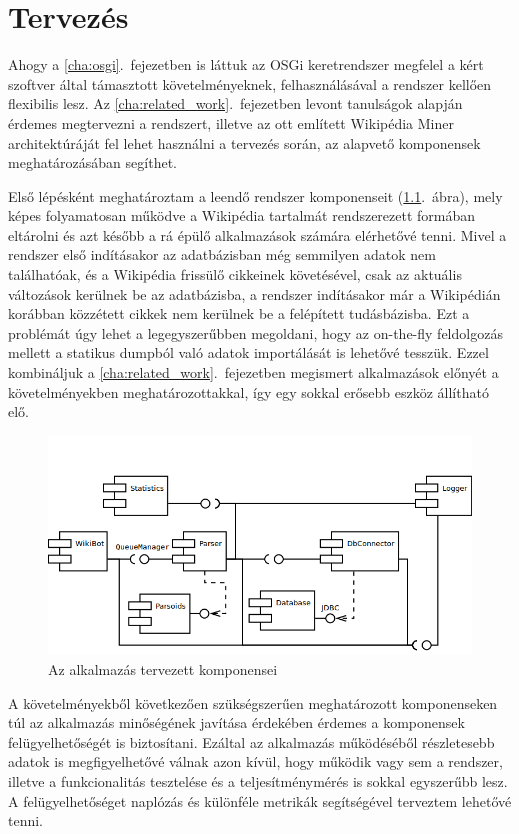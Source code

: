 \chapter{Tervezés}
\label{cha:design}

Ahogy a \ref{cha:osgi}.~fejezetben is láttuk az OSGi keretrendszer megfelel a kért szoftver által támasztott követelményeknek, felhasználásával a rendszer kellően flexibilis lesz. Az \ref{cha:related_work}.~fejezetben levont tanulságok alapján érdemes megtervezni a rendszert, illetve az ott említett Wikipédia Miner architektúráját fel lehet használni a tervezés során, az alapvető komponensek meghatározásában segíthet.

Első lépésként meghatároztam a leendő rendszer komponenseit (\ref{fig:componentdiagram}.~ábra), mely képes folyamatosan működve a Wikipédia tartalmát rendszerezett formában eltárolni és azt később a rá épülő alkalmazások számára elérhetővé tenni. Mivel a rendszer első indításakor az adatbázisban még semmilyen adatok nem találhatóak, és a Wikipédia frissülő cikkeinek követésével, csak az aktuális változások kerülnek be az adatbázisba, a rendszer indításakor már a Wikipédián korábban közzétett cikkek nem kerülnek be a felépített tudásbázisba. Ezt a problémát úgy lehet a legegyszerűbben megoldani, hogy az on-the-fly feldolgozás mellett a statikus dumpból való adatok importálását is lehetővé tesszük. Ezzel kombináljuk a \ref{cha:related_work}.~fejezetben megismert alkalmazások előnyét a követelményekben meghatározottakkal, így egy sokkal erősebb eszköz állítható elő.

\begin{figure}[htp]
\centering
\includegraphics[scale=0.5]{img/componentdiagram}
\caption{Az alkalmazás tervezett komponensei}
\label{fig:componentdiagram}
\end{figure}

A követelményekből következően szükségszerűen meghatározott komponenseken túl az alkalmazás minőségének javítása érdekében érdemes a komponensek felügyelhetőségét is biztosítani. Ezáltal az alkalmazás működéséből részletesebb adatok is megfigyelhetővé válnak azon kívül, hogy működik vagy sem a rendszer, illetve a funkcionalitás tesztelése és a teljesítménymérés is sokkal egyszerűbb lesz. A felügyelhetőséget naplózás és különféle metrikák segítségével terveztem lehetővé tenni.

